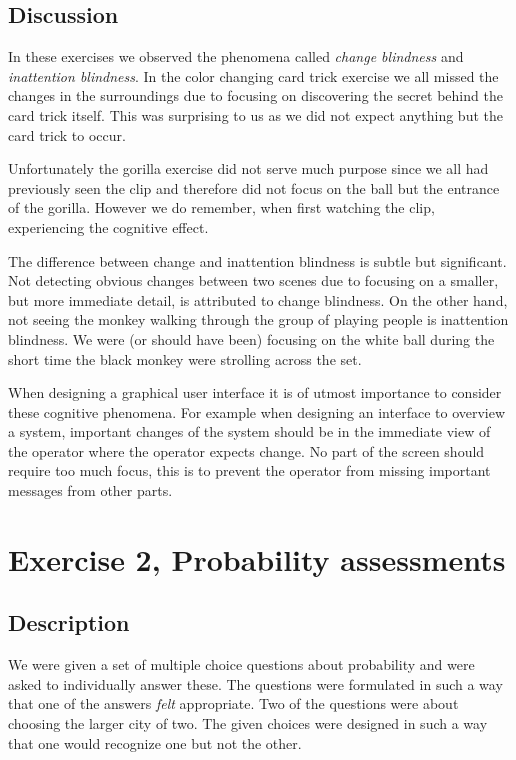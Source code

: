 \documentclass[10pt, a4paper]{article}
\begin{document}
\subsection{Discussion}
In these exercises we observed the phenomena called \emph{change blindness} and \emph{inattention blindness}. In the color changing card trick exercise we all missed the changes in the surroundings due to focusing on discovering the secret behind the card trick itself. This was surprising to us as we did not expect anything but the card trick to occur. 

Unfortunately the gorilla exercise did not serve much purpose since we all had previously seen the clip and therefore did not focus on the ball but the entrance of the gorilla. However we do remember, when first watching the clip, experiencing the cognitive effect.

The difference between change and inattention blindness is subtle but significant. Not detecting obvious changes between two scenes due to focusing on a smaller, but more immediate detail, is attributed to change blindness. On the other hand, not seeing the monkey walking through the group of playing people is inattention blindness. We were (or should have been) focusing on the white ball during the short time the black monkey were strolling across the set. %

When designing a graphical user interface it is of utmost importance to consider these cognitive phenomena. For example when designing an interface to overview a system, important changes of the system should be in the immediate view of the operator where the operator expects change. No part of the screen should require too much focus, this is to prevent the operator from missing important messages from other parts.


\section{Exercise 2, Probability assessments}
\subsection{Description}
We were given a set of multiple choice questions about probability and were asked to individually answer these. 
The questions were formulated in such a way that one of the answers \emph{felt} appropriate.
Two of the questions were about choosing the larger city of two. The given choices were designed in such a way that one would recognize one but not the other. 
\end{document}
